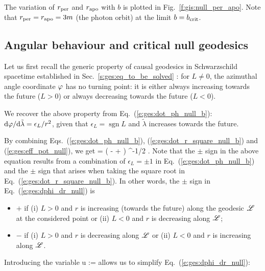 The variation of $r_{\rm per}$ and $r_{\rm apo}$ with $b$ is plotted
in Fig.~\ref{f:gis:null_per_apo}. Note that $r_{\rm per} = r_{\rm apo} = 3 m$
(the photon orbit) at the limit $b = b_{\rm crit}$.



\subsection{Angular behaviour and critical null geodesics}

Let us first recall the generic property of causal geodesics in Schwarzschild
spacetime established in Sec.~\ref{s:ges:eq_to_be_solved} : for $L\not=0$,
the azimuthal angle coordinate $\varphi$ has no turning point: it is either always increasing
towards the future
($L>0$) or always decreasing towards the future ($L<0$).
\begin{remark}
We recover the above property from Eq.~(\ref{e:ges:dot_ph_null_b}):
$\mathrm{d}\varphi/\mathrm{d}\tilde{\lambda} = \epsilon_L/r^2$, given that
$\epsilon_L = \operatorname{sgn} L$ and $\tilde{\lambda}$ increases towards
the future.
\end{remark}
By combining Eqs.~(\ref{e:ges:dot_ph_null_b}), (\ref{e:ges:dot_r_square_null_b})
and (\ref{e:ges:eff_pot_null}), we get
\be \label{e:ges:dphi_dr_null}
     = \pm {} \left( 
        -  +    \right) ^{-1/2} .
\ee
Note that the $\pm$ sign in the above equation results from a combination of
$\epsilon_L=\pm 1$ in Eq.~(\ref{e:ges:dot_ph_null_b}) and
the $\pm$ sign that arises when taking the square
root in Eq.~(\ref{e:ges:dot_r_square_null_b}). In other words, the $\pm$ sign
in Eq.~(\ref{e:ges:dphi_dr_null}) is
\begin{itemize}
\item $+$ if (i) $L>0$ and $r$ is increasing (towards the future) along the geodesic
$\mathscr{L}$ at the considered point or (ii) $L<0$ and $r$ is decreasing along $\mathscr{L}$;
\item $-$ if (i) $L>0$ and $r$ is decreasing along $\mathscr{L}$ or (ii)
$L<0$ and $r$ is increasing along $\mathscr{L}$.
\end{itemize}

Introducing the variable
\be
    u := 
\ee
allows us to simplify Eq.~(\ref{e:ges:dphi_dr_null}):
\be \label{e:ges:dphi_du_null}
\ee

